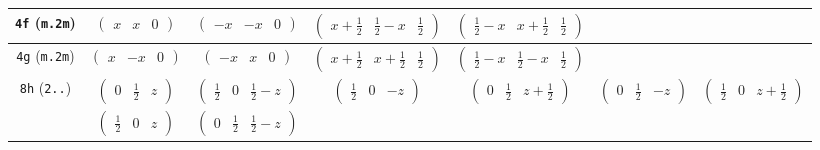 \documentclass[fleqn,9pt,landscape]{jsarticle}
\begin{document}
\begin{center}
\begin{longtable}{ccccccc}
{\tt 4f} ({\tt m.2m}) & $ \begin{pmatrix} x & x & 0 \end{pmatrix} $ & $ \begin{pmatrix} - x & - x & 0 \end{pmatrix} $ & $ \begin{pmatrix} x + \frac{1}{2} & \frac{1}{2} - x & \frac{1}{2} \end{pmatrix} $ & $ \begin{pmatrix} \frac{1}{2} - x & x + \frac{1}{2} & \frac{1}{2} \end{pmatrix} $ & $  $ & $  $ \\ \hline
{\tt 4g} ({\tt m.2m}) & $ \begin{pmatrix} x & - x & 0 \end{pmatrix} $ & $ \begin{pmatrix} - x & x & 0 \end{pmatrix} $ & $ \begin{pmatrix} x + \frac{1}{2} & x + \frac{1}{2} & \frac{1}{2} \end{pmatrix} $ & $ \begin{pmatrix} \frac{1}{2} - x & \frac{1}{2} - x & \frac{1}{2} \end{pmatrix} $ & $  $ & $  $ \\ \hline
{\tt 8h} ({\tt 2..}) & $ \begin{pmatrix} 0 & \frac{1}{2} & z \end{pmatrix} $ & $ \begin{pmatrix} \frac{1}{2} & 0 & \frac{1}{2} - z \end{pmatrix} $ & $ \begin{pmatrix} \frac{1}{2} & 0 & - z \end{pmatrix} $ & $ \begin{pmatrix} 0 & \frac{1}{2} & z + \frac{1}{2} \end{pmatrix} $ & $ \begin{pmatrix} 0 & \frac{1}{2} & - z \end{pmatrix} $ & $ \begin{pmatrix} \frac{1}{2} & 0 & z + \frac{1}{2} \end{pmatrix} $ \\
& $ \begin{pmatrix} \frac{1}{2} & 0 & z \end{pmatrix} $ & $ \begin{pmatrix} 0 & \frac{1}{2} & \frac{1}{2} - z \end{pmatrix} $ & $  $ & $  $ & $  $ & $  $ \\ \hline

\end{longtable}
\end{center}
\end{document}
